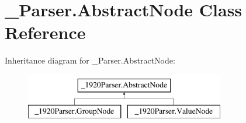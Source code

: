 \hypertarget{class__1920_parser_1_1_abstract_node}{}\section{\+\_\+Parser.\+Abstract\+Node Class Reference}
\label{class__1920_parser_1_1_abstract_node}


 


Inheritance diagram for \+\_\+Parser.\+Abstract\+Node\+:\begin{figure}[H]
\begin{center}
\leavevmode
\includegraphics[height=2.000000cm]{class__1920_parser_1_1_abstract_node}
\end{center}
\end{figure}
